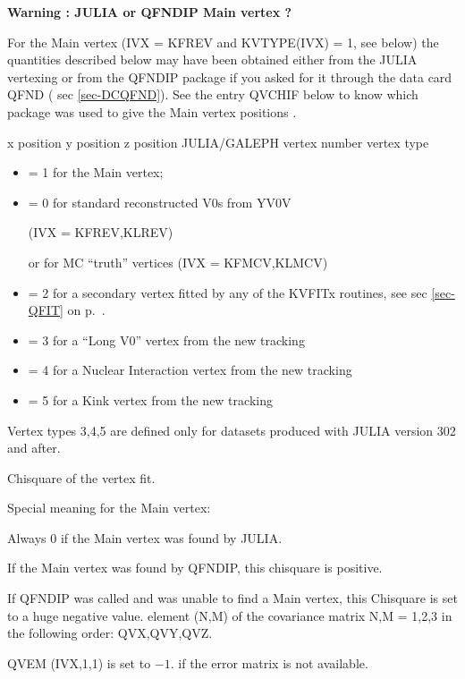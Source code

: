 {\bf Warning : JULIA or QFNDIP Main vertex ?}
 
For the Main vertex (IVX = KFREV and KVTYPE(IVX) = 1, see below) the quantities described below may have been
obtained either from the JULIA vertexing or from the QFNDIP package if you asked
for it through the data card QFND ( sec \ref{sec-DCQFND}). See the entry QVCHIF below to know which
package was used to give the Main vertex positions .

\begin{indentlist}{ 3.00cm}{ 3.25cm}
x position
y position
z position
JULIA/GALEPH vertex number
vertex type 

\begin{itemize}

\item  = 1 for the Main vertex; 
 
\item  = 0 for standard reconstructed V0s from YV0V

 (IVX = KFREV,KLREV) 

     or for MC ``truth'' vertices (IVX = KFMCV,KLMCV)

\item  = 2 for a secondary vertex fitted by any of the KVFITx routines, see sec \ref{sec-QFIT} on p.~\pageref{sec-QFIT}.

\item  = 3 for a ``Long V0'' vertex from the new tracking

\item  = 4 for a Nuclear Interaction vertex from the new tracking

\item  = 5 for a Kink vertex from the new tracking

\end{itemize}

 Vertex types 3,4,5 are defined only for datasets produced with JULIA version 302 and after.


Chisquare of the vertex fit.

 Special meaning for the Main vertex:

 Always 0 if the Main vertex was found by JULIA.

 If the Main vertex was found by QFNDIP, this chisquare is positive.

 If QFNDIP was called and was unable to find a Main vertex, this Chisquare is set
 to a huge negative value.
element (N,M) of the covariance matrix
N,M = 1,2,3 in the following order: QVX,QVY,QVZ. 

QVEM (IVX,1,1) is set to $-1.$
if the error matrix is not available.
\end{indentlist}
 
